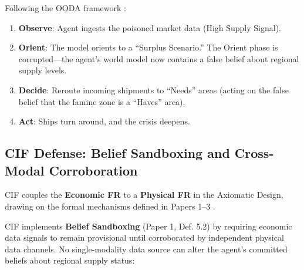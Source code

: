 \documentclass[
]{article}
\providecommand{\tightlist}{%
  \setlength{\itemsep}{0pt}\setlength{\parskip}{0pt}}
\begin{document}
Following the OODA framework \cite{boyd1987patterns}:

\begin{enumerate}
\def\labelenumi{\arabic{enumi}.}
\tightlist
\item
  \textbf{Observe}: Agent ingests the poisoned market data (High Supply
  Signal).
\item
  \textbf{Orient}: The model orients to a ``Surplus Scenario.'' The
  Orient phase is corrupted---the agent's world model now contains a
  false belief about regional supply levels.
\item
  \textbf{Decide}: Reroute incoming shipments to ``Needs'' areas (acting
  on the false belief that the famine zone is a ``Haves'' area).
\item
  \textbf{Act}: Ships turn around, and the crisis deepens.
\end{enumerate}

\subsection{CIF Defense: Belief Sandboxing and Cross-Modal
Corroboration}\label{cif-defense-belief-sandboxing-and-cross-modal-corroboration}

CIF couples the \textbf{Economic FR} to a \textbf{Physical FR} in the
Axiomatic Design, drawing on the formal mechanisms defined in Papers
1--3
\cite{friedman2026cogsec1, friedman2026cogsec2, friedman2026cogsec3}.

CIF implements \textbf{Belief Sandboxing} (Paper 1, Def. 5.2) by
requiring economic data signals to remain provisional until corroborated
by independent physical data channels. No single-modality data source
can alter the agent's committed beliefs about regional supply status:
\end{document}
